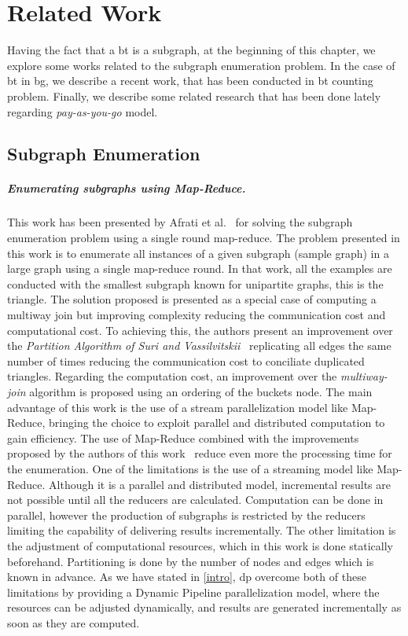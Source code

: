 \chapter{Related Work}\label{relate-work}
Having the fact that a \acrshort{bt} is a subgraph, at the beginning of this chapter, we explore some works related to the subgraph enumeration problem. 
In the case of \acrshort{bt} in \acrshort{bg}, we describe a recent work, that has been conducted in \acrshort{bt} counting problem.
Finally, we describe some related research that has been done lately regarding \emph{pay-as-you-go} model.

\section{Subgraph Enumeration}\label{sec:rel-work:subgraph}
\paragraph{Enumerating subgraphs using Map-Reduce.} This work has been presented by Afrati et al.~\cite{enumeratingsg} for solving the subgraph enumeration problem using a single round map-reduce.
The problem presented in this work is to enumerate all instances of a given subgraph (sample graph) in a large graph using a single map-reduce round. 
In that work, all the examples are conducted with the smallest subgraph known for unipartite graphs, this is the triangle.
The solution proposed is presented as a special case of computing a multiway join but improving complexity reducing the communication cost and computational cost.
To achieving this, the authors present an improvement over the \emph{Partition Algorithm of Suri and Vassilvitskii}~\cite{partitionalgo} replicating all edges the same number of times reducing the communication cost to conciliate duplicated triangles. 
Regarding the computation cost, an improvement over the \emph{multiway-join} algorithm is proposed using an ordering of the buckets node. 
The main advantage of this work is the use of a stream parallelization model like Map-Reduce, bringing the choice to exploit parallel and distributed computation to gain efficiency. 
The use of Map-Reduce combined with the improvements proposed by the authors of this work~\cite{enumeratingsg} reduce even more the processing time for the enumeration. 
One of the limitations is the use of a streaming model like Map-Reduce. Although it is a parallel and distributed model, incremental results are not possible until all the reducers are calculated. Computation can be done in parallel, however the production of subgraphs is restricted by the reducers limiting the capability of delivering results incrementally. 
The other limitation is the adjustment of computational resources, which in this work is done statically beforehand. Partitioning is done by the number of nodes and edges which is known in advance.
As we have stated in \autoref{intro}, \acrshort{dp} overcome both of these limitations by providing a Dynamic Pipeline parallelization model, where the resources can be adjusted dynamically, and results are generated incrementally as soon as they are computed. 


